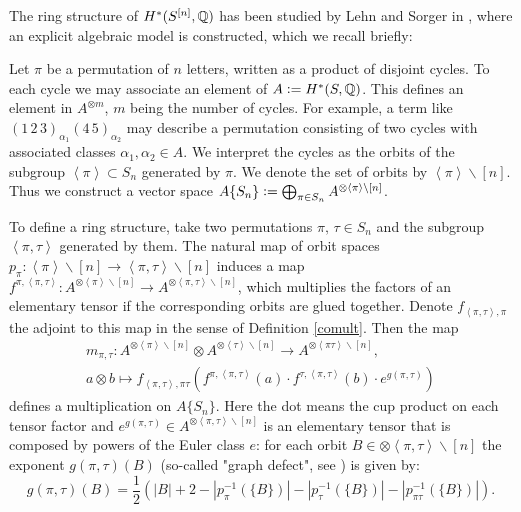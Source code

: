 The ring structure of $H^\ast(S^{[n]}, \mathbb{Q})$ has been studied by Lehn and Sorger in \cite{LehnSorger}, where an explicit algebraic model is constructed, which we recall briefly:
\begin{definition} \label{model}\cite[Sect. 2]{LehnSorger}
Let $\pi$ be a permutation of $n$ letters, written as a product of disjoint cycles. To each cycle we may associate an element of $A\vcentcolon= H^\ast(S,\mathbb{Q})$. This defines an element in $A^{\otimes m}$, $m$ being the number of cycles. For example, a term like $(1\,2\,3)_{\alpha_1}(4\,5)_{\alpha_2}$ may describe a permutation consisting of two cycles with associated classes $\alpha_1,\alpha_2\in A$. We interpret the cycles as the orbits of the subgroup $\left<\pi\right>\subset S_n$ generated by $\pi$. We denote the set of orbits by $\left<\pi\right>\backslash[n]$. Thus we construct a vector space $A\{S_n\}\vcentcolon= \bigoplus_{\pi\in S_n} A^{\otimes\left<\pi\right>\backslash[n]}$. 

To define a ring structure, take two permutations $\pi,\,\tau \in S_n$ and the subgroup $\left< \pi,\tau\right>$ generated by them. The natural map of orbit spaces
$
p_\pi:\left<\pi\right>\backslash[n] \rightarrow \left<\pi,\tau\right>\backslash[n]
$
induces a map $f^{\pi,\left<\pi,\tau\right>} : A^{\otimes\left<\pi\right>\backslash[n]} \rightarrow A^{\otimes\left<\pi,\tau\right>\backslash[n]}$, which multiplies the factors of an elementary tensor if the corresponding orbits are glued together.
Denote $f_{\left<\pi,\tau\right>,\pi} $ the adjoint to this map in the sense of Definition \ref{comult}. Then the map
\begin{gather*}
m_{\pi,\tau} : A^{\otimes\left<\pi\right>\backslash[n]} \otimes A^{\otimes\left<\tau\right>\backslash[n]} \longrightarrow A^{\otimes\left<\pi\tau\right>\backslash[n]} ,  \\
a\otimes b \longmapsto  f_{\left<\pi,\tau\right>,\pi\tau} (f^{\pi,\left<\pi,\tau\right>} (a)\cdot f^{\tau,\left<\pi,\tau\right>}(b)\cdot  e^{g(\pi,\tau)} ) 
\end{gather*}
defines a multiplication on $A\{S_n\}$. Here the dot means the cup product on each tensor factor and $e^{g(\pi,\tau)} \in A^{\otimes\left<\pi,\tau\right>\backslash[n]}$ is an elementary tensor that is composed by powers of the Euler class $e$: for each orbit $B \in  {\otimes\left<\pi,\tau\right>\backslash[n]}$ the exponent $g(\pi,\tau)(B)$ (so-called "graph defect", see \cite[2.6]{LehnSorger}) is given by:
$$
g(\pi,\tau)(B) = \frac{1}{2}\left( |B| +2 - |p_\pi^{-1}(\{B\})|- |p_\tau^{-1}(\{B\})| - |p_{\pi\tau}^{-1}(\{B\})|  \right).
$$

\end{definition}
